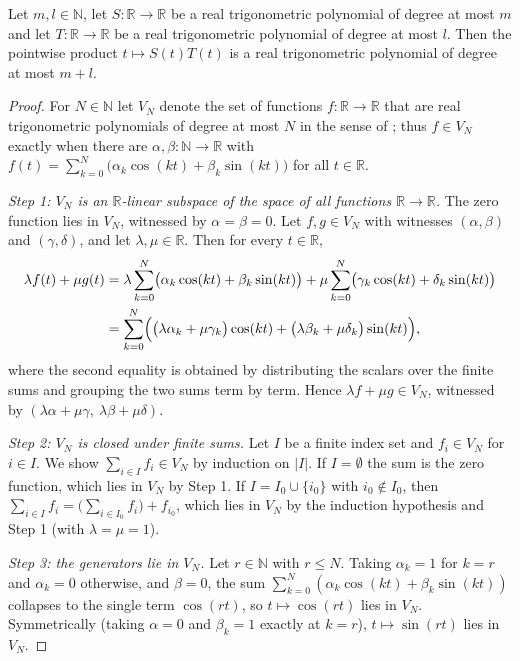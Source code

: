 \begin{lemma}
Let $m,l\in\mathbb{N}$, let $S:\mathbb{R}\to\mathbb{R}$ be a real
trigonometric polynomial of degree at most $m$ and let
$T:\mathbb{R}\to\mathbb{R}$ be a real trigonometric polynomial of degree at
most $l$. Then the pointwise product $t\mapsto S(t)T(t)$ is a real
trigonometric polynomial of degree at most $m+l$.
\end{lemma}
\begin{proof}
For $N\in\mathbb{N}$ let $V_N$ denote the set of functions
$f:\mathbb{R}\to\mathbb{R}$ that are real trigonometric polynomials of degree at
most $N$ in the sense of ; thus $f\in V_N$ exactly when
there are $\alpha,\beta:\mathbb{N}\to\mathbb{R}$ with
$f(t)=\sum_{k=0}^{N}\bigl(\alpha_k\cos(kt)+\beta_k\sin(kt)\bigr)$ for all
$t\in\mathbb{R}$.

\emph{Step 1: $V_N$ is an $\mathbb{R}$-linear subspace of the space of all
functions $\mathbb{R}\to\mathbb{R}$.} The zero function lies in $V_N$, witnessed
by $\alpha=\beta=0$. Let $f,g\in V_N$ with witnesses
$(\alpha,\beta)$ and $(\gamma,\delta)$, and let $\lambda,\mu\in\mathbb{R}$. Then
for every $t\in\mathbb{R}$,
\begin{align*}
  \lambda f(t)+\mu g(t)
  &=\lambda\sum_{k=0}^{N}\bigl(\alpha_k\cos(kt)+\beta_k\sin(kt)\bigr)
   +\mu\sum_{k=0}^{N}\bigl(\gamma_k\cos(kt)+\delta_k\sin(kt)\bigr)\\
  &=\sum_{k=0}^{N}\Bigl(\bigl(\lambda\alpha_k+\mu\gamma_k\bigr)\cos(kt)
    +\bigl(\lambda\beta_k+\mu\delta_k\bigr)\sin(kt)\Bigr),
\end{align*}
where the second equality is obtained by distributing the scalars over the
finite sums and grouping the two sums term by term. Hence
$\lambda f+\mu g\in V_N$, witnessed by
$(\lambda\alpha+\mu\gamma,\ \lambda\beta+\mu\delta)$.

\emph{Step 2: $V_N$ is closed under finite sums.} Let $I$ be a finite index set
and $f_i\in V_N$ for $i\in I$. We show $\sum_{i\in I}f_i\in V_N$ by induction on
$\lvert I\rvert$. If $I=\emptyset$ the sum is the zero function, which lies in
$V_N$ by Step 1. If $I=I_0\cup\{i_0\}$ with $i_0\notin I_0$, then
$\sum_{i\in I}f_i=\bigl(\sum_{i\in I_0}f_i\bigr)+f_{i_0}$, which lies in $V_N$
by the induction hypothesis and Step 1 (with $\lambda=\mu=1$).

\emph{Step 3: the generators lie in $V_N$.} Let $r\in\mathbb{N}$ with
$r\le N$. Taking $\alpha_k=1$ for $k=r$ and $\alpha_k=0$ otherwise, and
$\beta=0$, the sum $\sum_{k=0}^{N}(\alpha_k\cos(kt)+\beta_k\sin(kt))$ collapses
to the single term $\cos(rt)$, so $t\mapsto\cos(rt)$ lies in $V_N$. Symmetrically
(taking $\alpha=0$ and $\beta_k=1$ exactly at $k=r$), $t\mapsto\sin(rt)$ lies in
$V_N$.


\end{proof}
